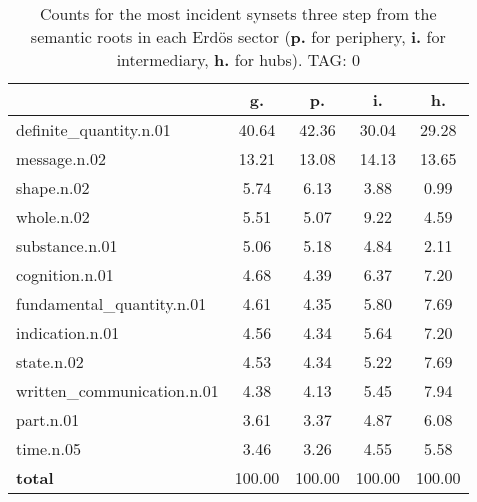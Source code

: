 \begin{table}[h!]
\begin{center}
\begin{tabular}{| l || c | c | c | c |}\hline
 & {\bf g.} & {\bf p.} & {\bf i.} & {\bf h.} \\\hline\hline
definite\_quantity.n.01 & 40.64  & 42.36  & 30.04  & 29.28 \\\hline
message.n.02 & 13.21  & 13.08  & 14.13  & 13.65 \\\hline
shape.n.02 & 5.74  & 6.13  & 3.88  & 0.99 \\\hline
whole.n.02 & 5.51  & 5.07  & 9.22  & 4.59 \\\hline
substance.n.01 & 5.06  & 5.18  & 4.84  & 2.11 \\\hline
cognition.n.01 & 4.68  & 4.39  & 6.37  & 7.20 \\\hline
fundamental\_quantity.n.01 & 4.61  & 4.35  & 5.80  & 7.69 \\\hline
indication.n.01 & 4.56  & 4.34  & 5.64  & 7.20 \\\hline
state.n.02 & 4.53  & 4.34  & 5.22  & 7.69 \\\hline
written\_communication.n.01 & 4.38  & 4.13  & 5.45  & 7.94 \\\hline
part.n.01 & 3.61  & 3.37  & 4.87  & 6.08 \\\hline
time.n.05 & 3.46  & 3.26  & 4.55  & 5.58 \\\hline\hline
{{\bf total}} & 100.00  & 100.00  & 100.00  & 100.00 \\\hline
\end{tabular}
\caption{Counts for the most incident synsets three step from the semantic roots in each Erd\"os sector ({\bf p.} for periphery, {\bf i.} for intermediary, {\bf h.} for hubs). TAG: 0}
\end{center}
\end{table}